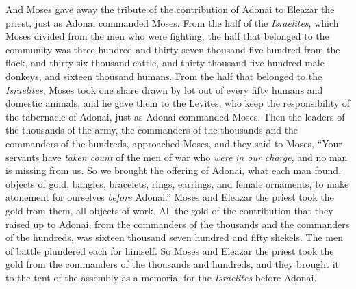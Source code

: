\begin{biblechapter}
\verse And Moses gave away the tribute of the contribution of Adonai to Eleazar the priest, just as Adonai commanded Moses.
\verse From the half of the \textit{Israelites}, which Moses divided from the men who were fighting,
\verse the half that belonged to the community was three hundred and thirty-seven thousand five hundred from the flock,
\verse and thirty-six thousand cattle,
\verse and thirty thousand five hundred male donkeys,
\verse and sixteen thousand humans.
\verse From the half that belonged to the \textit{Israelites}, Moses took one share drawn by lot out of every fifty humans and domestic animals, and he gave them to the Levites, who keep the responsibility of the tabernacle of Adonai, just as Adonai commanded Moses.
\verse Then the leaders of the thousands of the army, the commanders of the thousands and the commanders of the hundreds, approached Moses,
\verse and they said to Moses, “Your servants have \textit{taken count} of the men of war who \textit{were} \textit{in our charge}, and no man is missing from us.
\verse So we brought the offering of Adonai, what each man found, objects of gold, bangles, bracelets, rings, earrings, and female ornaments, to make atonement for ourselves \textit{before} Adonai.”
\verse Moses and Eleazar the priest took the gold from them, all objects of work.
\verse All the gold of the contribution that they raised up to Adonai, from the commanders of the thousands and the commanders of the hundreds, was sixteen thousand seven hundred and fifty shekels.
\verse The men of battle plundered each for himself.
\verse So Moses and Eleazar the priest took the gold from the commanders of the thousands and hundreds, and they brought it to the tent of the assembly as a memorial for the \textit{Israelites} before Adonai.
\end{biblechapter}


